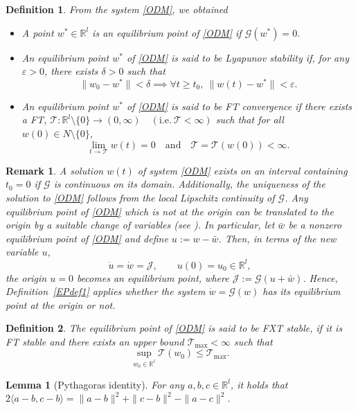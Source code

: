 \documentclass{article}
\theoremstyle{plain}%
\newtheorem{lemma}{Lemma}[section]%
\newtheorem{remark}{Remark}%
\theoremstyle{thmstyletwo}%
\theoremstyle{thmstylethree}%
\newtheorem{definition}{Definition}%
\begin{document}
\begin{definition}\cite{5,6}\label{EPdef1}
From the system \eqref{ODM}, we obtained
\begin{itemize}
    \item[(a)] 
    A point \(w^* \in\mathbb{R}^l\) is an \emph{equilibrium point} of \eqref{ODM} if \(\mathcal{G}(w^*) = 0.\)
    \item[(b)] 
    An equilibrium point \(w^*\) of \eqref{ODM} is said to be Lyapunov stability if, 
    for any \(\varepsilon > 0\), there exists \(\delta > 0\) such that 
    \[\|w_0-w^*\|<\delta\implies\forall t\ge t_0,\ \|w(t)-w^*\|<\varepsilon .\]
    \item [(c)] An equilibrium point \(w^*\) of \eqref{ODM} is said to be FT convergence if  there exists a FT, $\mathcal{T}:\mathbb{R}^l\setminus\{0\}\to (0,\infty)\quad (\text{i.e.}\ \mathcal{T} < \infty)$ such that for all $w(0) \in N \setminus \{0\}$,
    \[ \lim_{t \to \mathcal{T}} w(t)=0 \quad \text{and} \quad \mathcal{T} = \mathcal{T}(w(0)) < \infty.
    \]
\end{itemize}
\end{definition}

\begin{remark}
A solution \(w(t)\) of system \eqref{ODM} exists on an interval containing \(t_{0}=0\) if \(\mathcal{G}\) is continuous on its domain. Additionally, the uniqueness of the solution to \eqref{ODM} follows from the local Lipschitz continuity of \(\mathcal{G}\). Any equilibrium point of \eqref{ODM} which is not at the origin can be translated to the origin by a suitable change of variables (see \cite{7}). In particular, let \(\bar{w}\) be a nonzero equilibrium point of \eqref{ODM} and define \(u:= w-\bar{w}\). Then, in terms of the new variable \(u\),
\[
\dot{u}=\dot{w}=\mathcal{J}, \qquad u(0)=u_{0}\in \mathbb{R}^{l},
\]
the origin \(u=0\) becomes an equilibrium point, where \(\mathcal{J}:=\mathcal{G}(u+\bar{w})\). Hence, Definition~\eqref{EPdef1} applies whether the system $\dot{w}=\mathcal{G}(w)$ has its equilibrium point at the origin or not.

\end{remark}

\begin{definition}\cite{18}
The equilibrium point of \eqref{ODM} is said to be FXT stable, if it is FT stable and there exists an upper bound $\mathcal{T}_{\max} < \infty$ such that
\[
    \sup_{w_0 \in \mathbb{R}^l} \mathcal{T}(w_0) \leq \mathcal{T}_{\max}.
\]
\end{definition}
\begin{lemma}[Pythagoras identity]
For any $a, b, c \in \mathbb{R}^l$, it holds that $2\langle a - b, c - b \rangle = \|a - b\|^2 + \|c - b\|^2 - \|a - c\|^2$.\\
\end{lemma}
\end{document}
